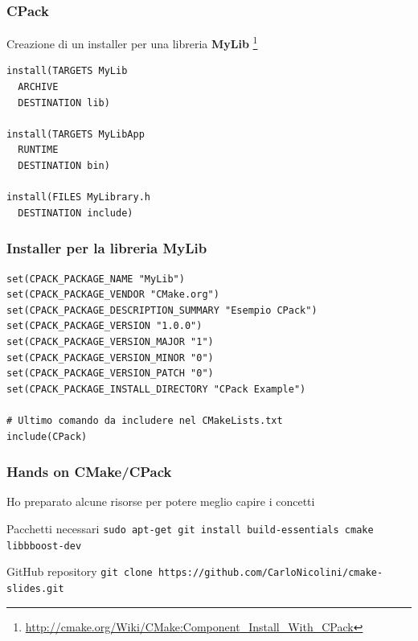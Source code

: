 \documentclass[10pt] {beamer}
\begin{document}
\begin{frame}[fragile]
\frametitle{CPack}
Creazione di un installer per una libreria  \textbf{MyLib} \footnote{\url{http://cmake.org/Wiki/CMake:Component_Install_With_CPack}}
\begin{verbatim}
install(TARGETS MyLib 
  ARCHIVE
  DESTINATION lib)

install(TARGETS MyLibApp
  RUNTIME
  DESTINATION bin)

install(FILES MyLibrary.h
  DESTINATION include)
\end{verbatim}
\end{frame}

\begin{frame}[fragile]
 \frametitle{Installer per la libreria MyLib}
\begin{verbatim}
set(CPACK_PACKAGE_NAME "MyLib")
set(CPACK_PACKAGE_VENDOR "CMake.org")
set(CPACK_PACKAGE_DESCRIPTION_SUMMARY "Esempio CPack")
set(CPACK_PACKAGE_VERSION "1.0.0")
set(CPACK_PACKAGE_VERSION_MAJOR "1")
set(CPACK_PACKAGE_VERSION_MINOR "0")
set(CPACK_PACKAGE_VERSION_PATCH "0")
set(CPACK_PACKAGE_INSTALL_DIRECTORY "CPack Example")

# Ultimo comando da includere nel CMakeLists.txt
include(CPack)
\end{verbatim}
\end{frame}


\begin{frame}
\frametitle{Hands on CMake/CPack}

Ho preparato alcune risorse per potere meglio capire i concetti 
\begin{block}{Pacchetti necessari}
\texttt{sudo apt-get git install build-essentials cmake libbboost-dev}
\end{block}

\begin{block}{GitHub repository}
\texttt{git clone https://github.com/CarloNicolini/cmake-slides.git} 
\end{block}

\end{frame}

\end{document}
